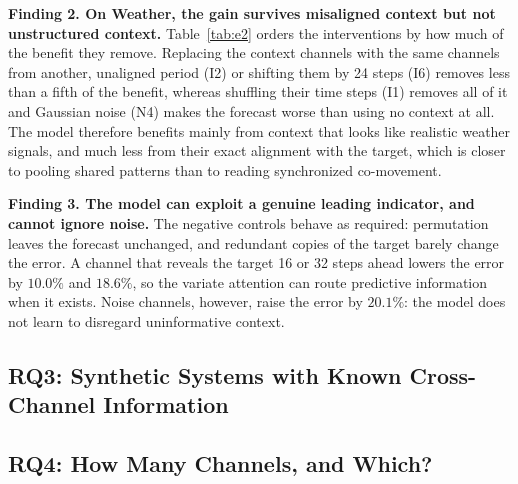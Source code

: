 \documentclass[runningheads]{llncs}
\newif\ifshowtodos
\newcommand{\todo}[1]{\ifshowtodos\textcolor{red}{[TODO: #1]}\fi}
\newcommand{\Ben}{B}
\newcommand{\Rel}{R}
\begin{document}
\noindent\textbf{Finding 2. On Weather, the gain survives misaligned context
but not unstructured context.}
Table~\ref{tab:e2} orders the interventions by how much of the benefit they
remove. Replacing the context channels with the same channels from another,
unaligned period (I2) or shifting them by 24 steps (I6) removes less than a
fifth of the benefit, whereas shuffling their time steps (I1) removes all of
it and Gaussian noise (N4) makes the forecast worse than using no context at
all. The model therefore benefits mainly from context that looks like
realistic weather signals, and much less from their exact alignment with the
target, which is closer to pooling shared patterns than to reading
synchronized co-movement. \todo{I2 retains more of the benefit than the
week-aligned I3, contrary to expectation; the intervals overlap, so confirm
with the larger rerun before interpreting.}

\noindent\textbf{Finding 3. The model can exploit a genuine leading
indicator, and cannot ignore noise.}
The negative controls behave as required: permutation leaves the forecast
unchanged, and redundant copies of the target barely change the error. A
channel that reveals the target 16 or 32 steps ahead lowers the error by
$10.0\%$ and $18.6\%$, so the variate attention can route predictive
information when it exists. Noise channels, however, raise the error by
$20.1\%$: the model does not learn to disregard uninformative context.
\todo{Report Electricity, Solar and Traffic after the rerun with fixed
groups; report $\Delta$MSE instead of $\Rel$ where the interval of $\Ben$
contains zero.}

\subsection{RQ3: Synthetic Systems with Known Cross-Channel Information}\label{sec:rq3}
\todo{Rerun after the Kalman oracle passes its unit tests. The current results
are not usable: the model beats the multivariate oracle in 30 of 39
configurations, which is impossible for a correct oracle.}

\subsection{RQ4: How Many Channels, and Which?}\label{sec:rq4}
\todo{Rerun with $K>32$ passed directly to the forecaster rather than through
the evaluator's 32-channel blocks; the current $K=64$ and $K=128$ results are
identical to $K=32$ because the model never saw more than 32 channels.
Current data (for $K\leq 32$, to be confirmed): on Electricity, random
selection is slightly better than top-$K$ selection at every $K\geq 4$; on
Solar-Energy, every added channel increases the error for all three
strategies.}
\end{document}
